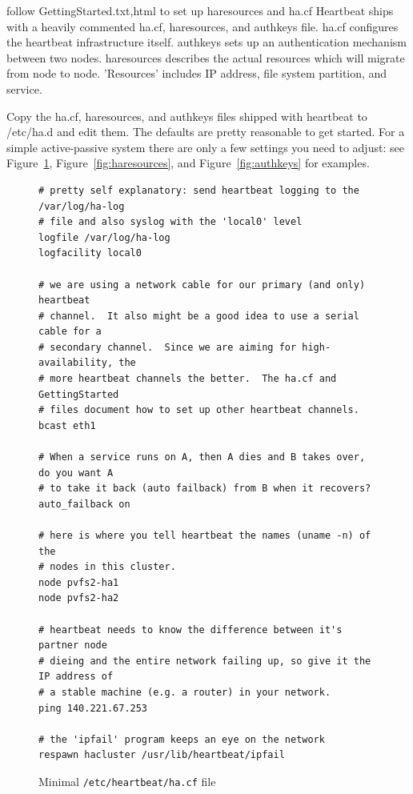 \documentclass[11pt]{article}
\begin{document}
follow GettingStarted.{txt,html} to set up haresources and ha.cf
Heartbeat ships with a heavily commented ha.cf, haresources, and
authkeys file.  ha.cf configures the heartbeat infrastructure itself.
authkeys sets up an authentication mechanism between two nodes.
haresources describes the actual resources which will migrate from node
to node.  'Resources' includes IP address, file system partition, and
service. 

Copy the ha.cf, haresources, and authkeys files shipped with heartbeat
to /etc/ha.d and edit them. The defaults are pretty reasonable to get
started.  For a simple active-passive system
there are only a few settings you need to adjust: see
Figure~\ref{fig:haconfig}, Figure~\ref{fig:haresources}, and
Figure~\ref{fig:authkeys} for examples.

\begin{figure}
\begin{verbatim}
# pretty self explanatory: send heartbeat logging to the /var/log/ha-log
# file and also syslog with the 'local0' level
logfile /var/log/ha-log
logfacility local0

# we are using a network cable for our primary (and only) heartbeat
# channel.  It also might be a good idea to use a serial cable for a
# secondary channel.  Since we are aiming for high-availability, the
# more heartbeat channels the better.  The ha.cf and GettingStarted
# files document how to set up other heartbeat channels.
bcast eth1

# When a service runs on A, then A dies and B takes over, do you want A
# to take it back (auto failback) from B when it recovers?  
auto_failback on

# here is where you tell heartbeat the names (uname -n) of the
# nodes in this cluster.
node pvfs2-ha1
node pvfs2-ha2

# heartbeat needs to know the difference between it's partner node
# dieing and the entire network failing up, so give it the IP address of
# a stable machine (e.g. a router) in your network.
ping 140.221.67.253

# the 'ipfail' program keeps an eye on the network
respawn hacluster /usr/lib/heartbeat/ipfail
\end{verbatim}
\caption{Minimal \texttt{/etc/heartbeat/ha.cf} file}
\label{fig:haconfig}
\end{figure}
\end{document}
